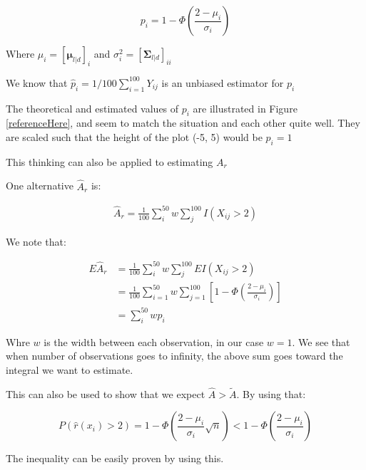 \documentclass[]{article}
\newcommand{\vect}[1]{\ensuremath{\boldsymbol{\mathbf{#1}}}}
\newcommand{\matr}[1]{\ensuremath{\boldsymbol{\mathbf{#1}}}}
\begin{document}
\begin{equation}
    p_i = 1 - \Phi\left(\frac{2 -  \mu_i}{\sigma_i}\right)
\end{equation}

Where \(\mu_i = \left[\vect \mu_{l|d}\right]_i\) and
\(\sigma_i^2 = \left[\matr \Sigma_{l|d}\right]_{ii}\)

We know that \(\hat p_i = 1/100\sum_{i=1}^{100}Y_{ij}\) is an unbiased
estimator for \(p_i\)

The theoretical and estimated values of \(p_i\) are illustrated in
Figure \ref{referenceHere}, and seem to match the situation and each
other quite well. They are scaled such that the height of the plot (-5,
5) would be \(p_i = 1\)

This thinking can also be applied to estimating \(A_r\)

One alternative \(\hat A_r\) is:

\begin{equation}
    \begin{split}
        \hat A_r =  \frac{1}{100}\sum_i^{50}w\sum_j^{100}I(X_{ij} > 2)  
    \end{split}
\end{equation}

We note that:

\begin{equation}
    \begin{split}
        E\hat A_r &=  \frac{1}{100}\sum_i^{50}w\sum_j^{100}EI(X_{ij} > 2) \\ &=   \frac{1}{100}\sum_{i=1}^{50}w\sum_{j=1}^{100}\left[1 - \Phi\left(\frac{2 -  \mu_i}{\sigma_i}\right)\right] \\
        &= \sum_i^{50}wp_i
    \end{split}
\end{equation}

Whre \(w\) is the width between each observation, in our case \(w=1\).
We see that when number of observations goes to infinity, the above sum
goes toward the integral we want to estimate.

This can also be used to show that we expect \(\hat A > \tilde A\). By
using that:

\begin{equation}
    P(\hat r(x_i) > 2) = 1 - \Phi\left(\frac{2-\mu_i}{\sigma_i}\sqrt{n}\right) < 1 - \Phi\left(\frac{2-\mu_i}{\sigma_i}\right)
\end{equation}

The inequality can be easily proven by using this.
\end{document}
